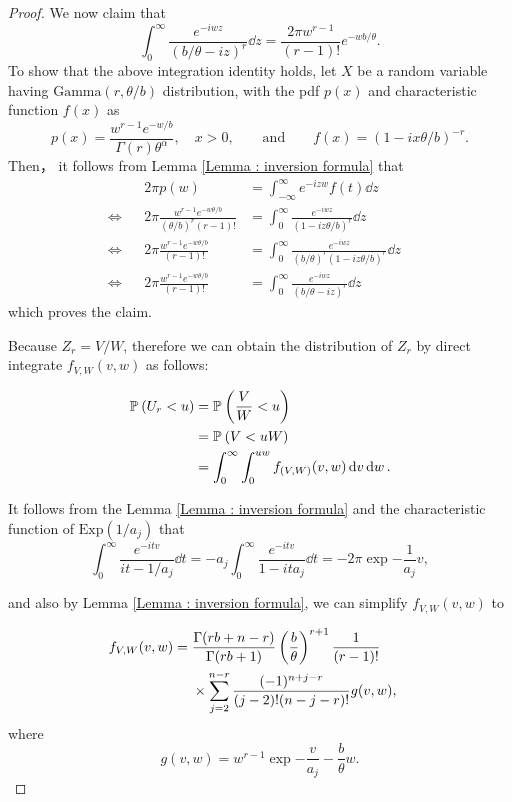 \documentclass{report}
\begin{document}
\begin{proof}
   We now claim that
   \[ 
    \int_0^\infty \frac{e^{-iwz}}{(b/\theta - iz)^r} \dd{z} = \frac{2\pi w^{r-1}}{(r-1)!} e^{-wb/\theta}.
    \]
   To show that the above integration identity holds, let $X$ be a random variable having $\mathrm{Gamma}(r,\theta/b)$ distribution, with the pdf $p(x)$ and characteristic function $f(x)$ as
   \[ 
       p(x) =  \frac{w^{r-1}e^{-w/b}}{\Gamma(r)\theta^{\alpha} },\quad x>0, \qquad \text{and} \qquad f(x) = (1-ix \theta/b)^{-r}.
   \]
   Then， it follows from Lemma \ref{Lemma : inversion formula} that
   \begin{align*}
       && 2\pi p(w) &=  \int_{-\infty}^{\infty} e^{-izw} f(t) \dd{z}
       & \\
      \iff && 2\pi \frac{w^{r-1}e^{-w\theta/b}}{(\theta/b)^r(r-1)!} &=\int_0^\infty \frac{e^{-iwz}}{(1-iz\theta/b)^r} \dd{z}
      & \\
      \iff && 2\pi \frac{w^{r-1}e^{-w\theta/b}}{(r-1)!} &= \int_0^\infty \frac{e^{-iwz}}{(b/\theta)^r  (1-iz\theta/b)^r} \dd{z}
      & \\
     \iff &&  2\pi \frac{w^{r-1}e^{-w\theta/b}}{(r-1)!} &= \int_0^\infty \frac{e^{-iwz}}{(b/\theta - iz)^r} \dd{z}   
   \end{align*}
   which proves the claim.

   Because $Z_r = V/W$, therefore we can obtain the distribution of $Z_r$ by direct integrate $f_{V,W}(v,w)$ as follows:

   \begin{align*}
    \P{U_r < u} &= \P{ \frac{V}{W} <u}
    \\
    &= \P{V < uW}
    \\
    &= \int_0^\infty \int_0^{uw} f_{(V,W)}(v,w) \dd{v} \dd{w}.
\end{align*}

It follows from the Lemma \ref{Lemma : inversion formula} and the characteristic function of $\mathrm{Exp}(1/a_j)$ that
\[ 
    \int_0^\infty \frac{e^{-itv}}{it- 1/a_j} \dd{t} = -a_j \int_0^\infty \frac{e^{-itv}}{1-it a_j} \dd{t} = -2\pi \exp{-\frac{1}{a_j} v},
    \]
    
    and also by Lemma \ref{Lemma : inversion formula}, we can simplify $f_{V,W}(v,w)$ to

\begin{align*}
    f_{V,W}(v,w) &= \begin{aligned}[t]
        &\frac{\Gamma(rb+n-r)}{\Gamma(rb+1)} \left(\frac{b}{\theta}\right)^{r+1} \frac{1}{(r-1)!}
        \\
        &\times \sumj[2]{n-r} \frac{(-1)^{n+j-r}}{(j-2)!(n-j-r)!} g(v,w),
    \end{aligned}
\end{align*}
where
\[ 
    g(v,w) = w^{r-1}\exp{-\frac{v}{a_j} - \frac{b}{\theta} w}.
\]


\end{proof}
\end{document}
